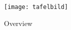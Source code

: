 \newpage
\visHeader


\begin{figure}[htbp]
	\centering
  \texttt{[image: tafelbild]}
	\caption{Overview}
	\label{fig_Overview}
\end{figure}